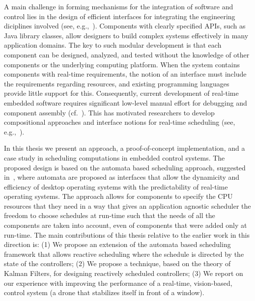 \documentclass[ twoside, 12pt ]{article}
\begin{document}
A main challenge in forming mechanisms for the integration of software and control lies in the design of efficient interfaces for integrating the engineering diciplines involved (see, e.g.,~\cite{weiss2007automata}). Components with clearly specified APIs, such as Java library classes, allow designers to build
complex systems effectively in many application domains.  The key to such modular development is
that each component can be designed, analyzed, and tested without the knowledge of other
components or the underlying computing platform. When the system contains components with
real-time requirements, the notion of an interface must include the requirements regarding
resources, and existing programming languages provide little support for this.  Consequently,
current development of real-time embedded software requires significant low-level manual effort for
debugging and component assembly (cf.~\cite{Lee00,IEEE03,HS06}). This has motivated 
researchers to develop compositional approaches and interface notions for real-time scheduling (see, e.g.,~\cite{RS01,dH01,MF01,CAHS03,SL08,SLBS04,TWS06,DBLP:conf/lctrts/AuerbachBIKRRT07}).

In this thesis we present an approach, a proof-of-concept implementation, and a case study in scheduling computations in embedded control systems. The proposed design is based on the automata based scheduling approach, suggested in~\cite{weiss2007automata,RTComposer,AW08,ESNAASHARI20102410,liu2013synthesis}, where automata are proposed as interfaces that allow the dynamicity and efficiency of desktop operating systems with the predictability of real-time operating systems. The approach allows for components to specify the CPU resources that they need in a way that gives an application agnostic scheduler the freedom to choose schedules at run-time such that the needs of all the components are taken into account, even of components that were added only at run-time. The main contributions of this thesis relative to the earlier work in this direction is:
(1) We propose an extension of the automata based scheduling framework that allows reactive scheduling where the schedule is directed  by the state of the controllers; (2) We propose a technique, based on the theory of Kalman Filters, for designing reactively scheduled controllers; (3) We report on our experience with improving the performance of a real-time, vision-based, control system (a drone that stabilizes itself in front of a window).
\end{document}
